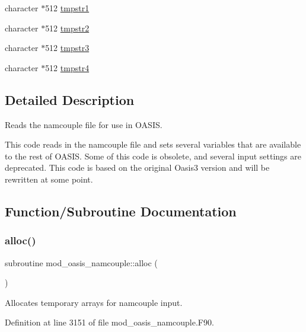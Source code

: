 \begin{DoxyCompactItemize}
\item 
character $\ast$512 \hyperlink{namespacemod__oasis__namcouple_aca533555969c4dff9419daac8c70bbda}{tmpstr1}
\item 
character $\ast$512 \hyperlink{namespacemod__oasis__namcouple_a675d6fc398ff3a060fbd9949fde4d0e2}{tmpstr2}
\item 
character $\ast$512 \hyperlink{namespacemod__oasis__namcouple_a5564b823ced851e25d198f2c300dc138}{tmpstr3}
\item 
character $\ast$512 \hyperlink{namespacemod__oasis__namcouple_ada1acbaf7e666b7220e3b7fb8d0f2549}{tmpstr4}
\end{DoxyCompactItemize}


\subsection{Detailed Description}
Reads the namcouple file for use in O\+A\+S\+IS. 

This code reads in the namcouple file and sets several variables that are available to the rest of O\+A\+S\+IS. Some of this code is obsolete, and several input settings are deprecated. This code is based on the original Oasis3 version and will be rewritten at some point. 

\subsection{Function/\+Subroutine Documentation}
\mbox{\label{namespacemod__oasis__namcouple_a0d85a5dcb3fab17a680cceed332b9668}} 
\subsubsection{\texorpdfstring{alloc()}{alloc()}}
{\footnotesize\ttfamily subroutine mod\+\_\+oasis\+\_\+namcouple\+::alloc (\begin{DoxyParamCaption}{ }\end{DoxyParamCaption})\hspace{0.3cm}{\ttfamily [private]}}



Allocates temporary arrays for namcouple input. 



Definition at line 3151 of file mod\+\_\+oasis\+\_\+namcouple.\+F90.

